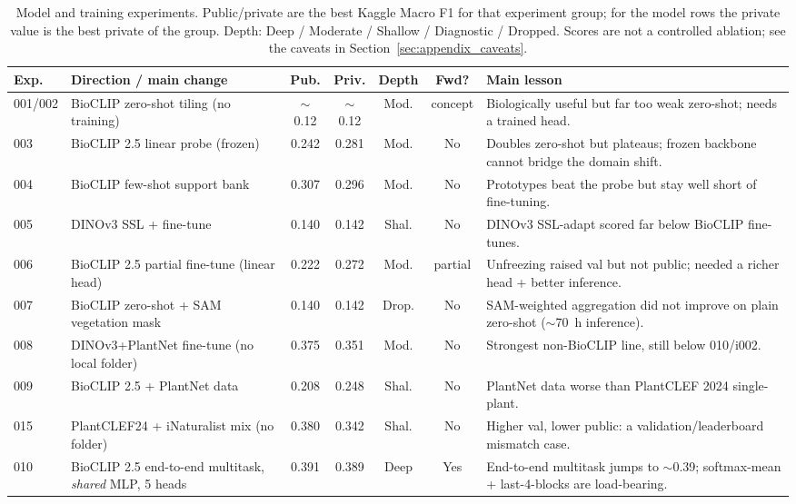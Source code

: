 \begin{table}[t]
\centering
\scriptsize
\setlength{\tabcolsep}{4pt}
\renewcommand{\arraystretch}{1.15}
\caption{Model and training experiments. Public/private are the
best Kaggle Macro F1 for that experiment group; for the model rows the private value
is the best private of the group. Depth: Deep / Moderate / Shallow / Diagnostic / Dropped. Scores are not a
controlled ablation; see the caveats in Section~\ref{sec:appendix_caveats}.}
\label{tab:appendix_main_models}
\begin{tabularx}{\linewidth}{@{}l l c c c c X@{}}
\toprule
\textbf{Exp.} & \textbf{Direction / main change} & \textbf{Pub.} & \textbf{Priv.} & \textbf{Depth} & \textbf{Fwd?} & \textbf{Main lesson} \\
\midrule
001/002 & BioCLIP zero-shot tiling (no training) & $\sim$0.12 & $\sim$0.12 & Mod. & concept & Biologically useful but far too weak zero-shot; needs a trained head. \\
003 & BioCLIP 2.5 linear probe (frozen) & 0.242 & 0.281 & Mod. & No & Doubles zero-shot but plateaus; frozen backbone cannot bridge the domain shift. \\
004 & BioCLIP few-shot support bank & 0.307 & 0.296 & Mod. & No & Prototypes beat the probe but stay well short of fine-tuning. \\
005 & DINOv3 SSL + fine-tune & 0.140 & 0.142 & Shal. & No & DINOv3 SSL-adapt scored far below BioCLIP fine-tunes. \\
006 & BioCLIP 2.5 partial fine-tune (linear head) & 0.222 & 0.272 & Mod. & partial & Unfreezing raised val but not public; needed a richer head + better inference. \\
007 & BioCLIP zero-shot + SAM vegetation mask & 0.140 & 0.142 & Drop. & No & SAM-weighted aggregation did not improve on plain zero-shot ($\sim$70~h inference). \\
008 & DINOv3+PlantNet fine-tune (no local folder) & 0.375 & 0.351 & Mod. & No & Strongest non-BioCLIP line, still below 010/i002. \\
009 & BioCLIP 2.5 + PlantNet data & 0.208 & 0.248 & Shal. & No & PlantNet data worse than PlantCLEF 2024 single-plant. \\
015 & PlantCLEF24 + iNaturalist mix (no folder) & 0.380 & 0.342 & Shal. & No & Higher val, lower public: a validation/leaderboard mismatch case. \\
010 & BioCLIP 2.5 end-to-end multitask, \emph{shared} MLP, 5 heads & 0.391 & 0.389 & Deep & Yes & End-to-end multitask jumps to $\sim$0.39; softmax-mean + last-4-blocks are load-bearing. \\

\end{tabularx}
\end{table}
